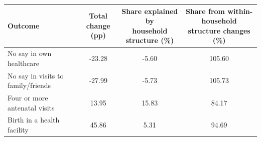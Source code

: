 \begin{tabular}{lccc}
\toprule
Outcome & \makecell{Total change\\(pp)} & \makecell{Share explained by \\household structure (\%)} & \makecell{Share from within-\\household structure changes (\%)} \\
\midrule
No say in own healthcare&-23.28&-5.60&105.60\\
No say in visits to family/friends&-27.99&-5.73&105.73\\
Four or more antenatal visits&13.95&15.83&84.17\\
Birth in a health facility&45.86&5.31&94.69\\
\bottomrule
\end{tabular}
